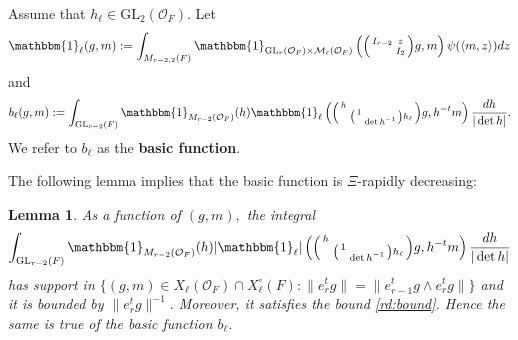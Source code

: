 \documentclass[12pt]{amsart}
\newtheorem{lem}[thm]{Lemma}
\theoremstyle{remark}
\numberwithin{equation}{section}
\newcommand{\GL}{\mathrm{GL}}
\newcommand{\OO}{\mathcal{O}}
\theoremstyle{definition}
\newenvironment{psmatrix}
  {\left(\begin{smallmatrix}}
  {\end{smallmatrix}\right)}
\numberwithin{equation}{subsection}
\newcommand{\one}{\mathbbm{1}}
\newcommand{\norm}[1]{\lVert#1\rVert}
\begin{document}
Assume that $h_\ell\in \mathrm{GL}_2(\OO_F)$. Let
\begin{align*}
    \one_{\ell}(g,m):=\int_{M_{r-2,2}(F)}\one_{\GL_r(\OO_F) \times \mathcal{M}_{\ell}(\OO_F)}\left(\begin{psmatrix} I_{r-2} & z\\ & I_2 \end{psmatrix}g,m\right)\psi(\langle m,z \rangle)dz
\end{align*}
and 
\begin{align} \label{bell}
b_{\ell}(g,m):=\int_{\GL_{r-2}(F)}\one_{M_{r-2}(\OO_F)}(h)\one_{\ell}\left(\begin{psmatrix}h & \\ & \begin{psmatrix}1 & \\  & \det h^{-1}\end{psmatrix}h_\ell \end{psmatrix}g,h^{-t}m\right)\frac{dh}{|\det h|}.
\end{align}
We refer to $b_\ell$ as the \textbf{basic function}.

The following lemma implies that the basic function is $\Xi$-rapidly decreasing:

\begin{lem}\label{lem:basic:bound}
As a function of $(g,m),$ the integral 
\begin{align} \label{bound:basic}
\int_{\GL_{r-2}(F)}\one_{M_{r-2}(\OO_F)}(h)|\one_{\ell}|\left(\begin{psmatrix}h & \\ & \begin{psmatrix}1 & \\  & \det h^{-1}\end{psmatrix}h_\ell
\end{psmatrix}g,h^{-t}m\right)\frac{dh}{|\det h|}
\end{align}
has support in 
$
\{(g,m) \in X_\ell(\mathcal{O}_F) \cap X_{\ell}^{\circ}(F):\norm{e_{r}^tg}=\norm{e_{r-1}^tg\wedge e_{r}^tg}\}$
and it is bounded by $\norm{e_r^tg}^{-1}.$  Moreover, it satisfies the bound \eqref{rd:bound}. Hence the same is true of the basic function $b_\ell.$
\end{lem}
\end{document}
